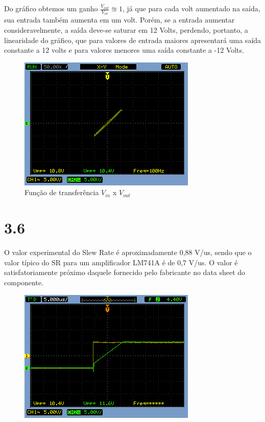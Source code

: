 \documentclass[brazil]{article}
\begin{document}
Do gráfico obtemos um ganho $\frac{V_{out}}{V_{in}}\approxeq 1$, já que para cada volt aumentado na saída, sua entrada também aumenta em um volt.
Porém, se a entrada aumentar consideravelmente, a saída deve-se saturar em 12 Volts, perdendo, portanto, a linearidade do gráfico, que para valores de entrada maiores apresentará uma saída constante a 12 volts e para valores menores uma saída constante a -12 Volts.

\begin{figure}[H]
\begin{centering}
\includegraphics[scale=0.5]{figuras/35xy}
\par\end{centering}
\caption{Função de transferência $V_{in}$ x $V_{out}$ \label{3.5}}
\end{figure}



\section*{3.6}
O valor experimental do Slew Rate é aproximadamente 0,88 V/us, sendo que o valor típico do SR para um amplificador LM741A é de 0,7 V/us. O valor é satisfatoriamente próximo daquele fornecido pelo fabricante no data sheet do componente. 


\begin{figure}[H]
\begin{centering}
\includegraphics[scale=0.5]{figuras/36}
\par\end{centering}
\caption{}
\end{figure}
\end{document}
